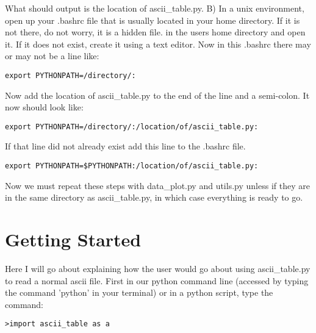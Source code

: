 What should output is the location of ascii\_table.py.
\newline
B) In a unix environment, open up your .bashrc file that is usually located in your home directory.  If it is not there, do not worry, it is a hidden file.
in the users home directory and open it.  If it does not exist, create it using a text editor.
Now in this .bashrc there may or may not be a line like:

\begin{verbatim}
export PYTHONPATH=/directory/:
\end{verbatim}

Now add the location of ascii\_table.py to the end of the line and a semi-colon.  It now should look like:

\begin{verbatim}
export PYTHONPATH=/directory/:/location/of/ascii_table.py:
\end{verbatim}

If that line did not already exist add this line to the .bashrc file.

\begin{verbatim}
export PYTHONPATH=$PYTHONPATH:/location/of/ascii_table.py:
\end{verbatim}

Now we must repeat these steps with data\_plot.py and utils.py unless if they are in the same directory as ascii\_table.py, in which case everything is ready to go.


\section{Getting Started}
Here I will go about explaining how the user would go about using ascii\_table.py to read a normal ascii file.
First in our python command line (accessed by typing the command 'python' in your terminal) or in a python script,
type the command:
\begin{verbatim}
>import ascii_table as a
\end{verbatim}
